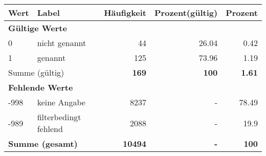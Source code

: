      \begin{longtable}{lXrrr}
     \toprule
     \textbf{Wert} & \textbf{Label} & \textbf{Häufigkeit} & \textbf{Prozent(gültig)} & \textbf{Prozent} \\
     \endhead
     \midrule
     \multicolumn{5}{l}{\textbf{Gültige Werte}}\\

     0 &
     \multicolumn{1}{X}{ nicht genannt   } &


       \num{44} &
       \num[round-mode=places,round-precision=2]{26.04} &
         \num[round-mode=places,round-precision=2]{0.42} \\

     1 &
     \multicolumn{1}{X}{ genannt   } &


       \num{125} &
       \num[round-mode=places,round-precision=2]{73.96} &
         \num[round-mode=places,round-precision=2]{1.19} \\
     \midrule
     \multicolumn{2}{l}{Summe (gültig)} &
       \textbf{\num{169}} &
     \textbf{\num{100}} &
       \textbf{\num[round-mode=places,round-precision=2]{1.61}} \\
     \multicolumn{5}{l}{\textbf{Fehlende Werte}}\\
       -998 &
       keine Angabe &
         \num{8237} &
        - &
         \num[round-mode=places,round-precision=2]{78.49} \\
       -989 &
       filterbedingt fehlend &
         \num{2088} &
        - &
         \num[round-mode=places,round-precision=2]{19.9} \\
     \midrule
     \multicolumn{2}{l}{\textbf{Summe (gesamt)}} &
          \textbf{\num{10494}} &
        \textbf{-} &
        \textbf{\num{100}} \\
     \bottomrule
     \end{longtable}
     
